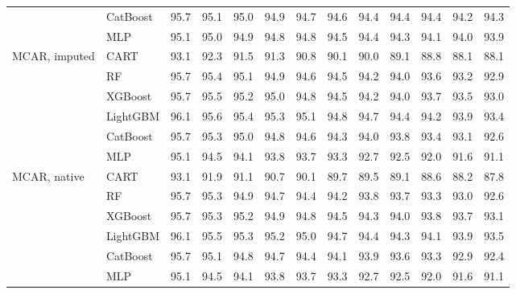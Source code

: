 \documentclass[pdflatex,sn-mathphys]{sn-jnl}
\theoremstyle{thmstyleone}
\begin{document}
\begin{table}[htbp]
\begin{tabular}{@{}llrrrrrrrrrrr@{}}
 & CatBoost & 95.7 & 95.1 & 95.0 & 94.9 & 94.7 & 94.6 & 94.4 & 94.4 & 94.4 & 94.2 & 94.3 \\
 & MLP & 95.1 & 95.0 & 94.9 & 94.8 & 94.8 & 94.5 & 94.4 & 94.3 & 94.1 & 94.0 & 93.9 \\
\midrule
MCAR, imputed & CART & 93.1 & 92.3 & 91.5 & 91.3 & 90.8 & 90.1 & 90.0 & 89.1 & 88.8 & 88.1 & 88.1 \\
 & RF & 95.7 & 95.4 & 95.1 & 94.9 & 94.6 & 94.5 & 94.2 & 94.0 & 93.6 & 93.2 & 92.9 \\
 & XGBoost & 95.7 & 95.5 & 95.2 & 95.0 & 94.8 & 94.5 & 94.2 & 94.0 & 93.7 & 93.5 & 93.0 \\
 & LightGBM & 96.1 & 95.6 & 95.4 & 95.3 & 95.1 & 94.8 & 94.7 & 94.4 & 94.2 & 93.9 & 93.4 \\
 & CatBoost & 95.7 & 95.3 & 95.0 & 94.8 & 94.6 & 94.3 & 94.0 & 93.8 & 93.4 & 93.1 & 92.6 \\
 & MLP & 95.1 & 94.5 & 94.1 & 93.8 & 93.7 & 93.3 & 92.7 & 92.5 & 92.0 & 91.6 & 91.1 \\
\midrule
MCAR, native & CART & 93.1 & 91.9 & 91.1 & 90.7 & 90.1 & 89.7 & 89.5 & 89.1 & 88.6 & 88.2 & 87.8 \\
 & RF & 95.7 & 95.3 & 94.9 & 94.7 & 94.4 & 94.2 & 93.8 & 93.7 & 93.3 & 93.0 & 92.6 \\
 & XGBoost & 95.7 & 95.3 & 95.2 & 94.9 & 94.8 & 94.5 & 94.3 & 94.0 & 93.8 & 93.7 & 93.1 \\
 & LightGBM & 96.1 & 95.5 & 95.3 & 95.2 & 95.0 & 94.7 & 94.4 & 94.3 & 94.1 & 93.9 & 93.5 \\
 & CatBoost & 95.7 & 95.1 & 94.8 & 94.7 & 94.4 & 94.1 & 93.9 & 93.6 & 93.3 & 92.9 & 92.4 \\
 & MLP & 95.1 & 94.5 & 94.1 & 93.8 & 93.7 & 93.3 & 92.7 & 92.5 & 92.0 & 91.6 & 91.1 \\
\bottomrule
\end{tabular}
\end{table}
\end{document}
